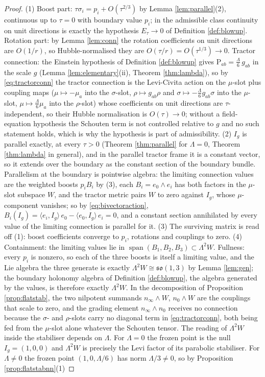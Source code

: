 \documentclass[11pt]{article}
\theoremstyle{definition}
\newcommand{\Sch}{\mathrm{P}}
\newcommand{\nO}{n_0}
\newcommand{\nInf}{n_\infty}
\newcommand{\ip}[2]{\langle #1, #2\rangle}
\begin{document}
\begin{proof}
(1) Boost part: $\tau\sigma_i = p_i + O(\tau^{2/3})$ by Lemma \ref{lem:parallel}(2), continuous up to $\tau = 0$ with boundary value $p_i$; in the admissible class continuity on unit directions is exactly the hypothesis $E_\tau \to 0$ of Definition \ref{def:blowup}. Rotation part: by Lemma \ref{lem:conn} the rotation coefficients on unit directions are $O(1/r)$, so Hubble-normalised they are $O(\tau/r) = O(\tau^{1/3}) \to 0$. Tractor connection: the Einstein hypothesis of Definition \ref{def:blowup} gives $\Sch_{ab} = \tfrac{\Lambda}{6}\,g_{ab}$ in the scale $g$ (Lemma \ref{lem:elementary}(ii), Theorem \ref{thm:lambda}), so by \eqref{eq:tractorconn} the tractor connection is the Levi-Civita action on the $\mu$-slot plus coupling maps ($\mu \mapsto -\mu_a$ into the $\sigma$-slot, $\rho \mapsto g_{ab}\rho$ and $\sigma \mapsto -\tfrac{\Lambda}{6}g_{ab}\sigma$ into the $\mu$-slot, $\mu \mapsto \tfrac{\Lambda}{6}\mu_a$ into the $\rho$-slot) whose coefficients on unit directions are $\tau$-independent, so their Hubble normalisation is $O(\tau) \to 0$; without a field-equation hypothesis the Schouten term is not controlled relative to $g$ and no such statement holds, which is why the hypothesis is part of admissibility. (2) $I_g$ is parallel exactly, at every $\tau > 0$ (Theorem \ref{thm:parallel} for $\Lambda = 0$, Theorem \ref{thm:lambda} in general), and in the parallel tractor frame it is a constant vector, so it extends over the boundary as the constant section of the boundary bundle. Parallelism at the boundary is pointwise algebra: the limiting connection values are the weighted boosts $p_i B_i$ by (3), each $B_i = e_0 \wedge e_i$ has both factors in the $\mu$-slot subspace $W$, and the tractor metric pairs $W$ to zero against $I_g$, whose $\mu$-component vanishes; so by \eqref{eq:bivectoraction}, $B_i(I_g) = \ip{e_i}{I_g}\,e_0 - \ip{e_0}{I_g}\,e_i = 0$, and a constant section annihilated by every value of the limiting connection is parallel for it. (3) The surviving matrix is read off (1): boost coefficients converge to $p_i$, rotations and couplings to zero. (4) Containment: the limiting values lie in $\operatorname{span}(B_1, B_2, B_3) \subset \Lambda^2 W$. Fullness: every $p_i$ is nonzero, so each of the three boosts is itself a limiting value, and the Lie algebra the three generate is exactly $\Lambda^2 W \cong \mathfrak{so}(1,3)$ by Lemma \ref{lem:gen}; the boundary holonomy algebra of Definition \ref{def:blowup}, the algebra generated by the values, is therefore exactly $\Lambda^2 W$. In the decomposition of Proposition \ref{prop:flatstab}, the two nilpotent summands $\nInf\wedge W$, $\nO\wedge W$ are the couplings that scale to zero, and the grading element $\nInf \wedge \nO$ receives no connection because the $\sigma$- and $\rho$-slots carry no diagonal term in \eqref{eq:tractorconn}, both being fed from the $\mu$-slot alone whatever the Schouten tensor. The reading of $\Lambda^2 W$ inside the stabiliser depends on $\Lambda$. For $\Lambda = 0$ the frozen point is the null $I_g = (1,0,0)$ and $\Lambda^2 W$ is precisely the Levi factor of its parabolic stabiliser. For $\Lambda \neq 0$ the frozen point $(1, 0, \Lambda/6)$ has norm $\Lambda/3 \neq 0$, so by Proposition \ref{prop:flatstabnn}(1) 
\end{proof}
\end{document}
